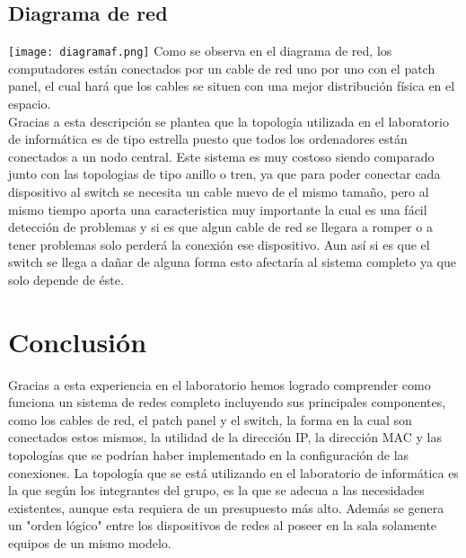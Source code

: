 \documentclass{udpreport}
\begin{document}
	\section{Diagrama de red}
		\texttt{[image: diagramaf.png]}
		Como se observa en el diagrama de red, los computadores están conectados por un cable de red uno por uno 
		con el patch panel, el cual hará que los cables se situen con una mejor distribución física 
		en el espacio.\\
		Gracias a esta descripción se plantea que la topología utilizada en el laboratorio de informática es de tipo estrella 
 		puesto que todos los ordenadores están conectados a un nodo central. Este sistema es muy costoso siendo comparado 
 		junto con las topologias de tipo anillo o tren, ya que para poder conectar cada dispositivo al switch se necesita un
 		cable nuevo de el mismo tamaño, pero al mismo tiempo aporta una caracteristica muy importante la cual es una fácil 
 		detección de problemas y si es que algun cable de red se llegara a romper o a tener problemas solo perderá la conexión
 		ese dispositivo. Aun así si es que el switch se llega a dañar de alguna forma esto afectaría al sistema completo ya
 		que solo depende de éste.
\chapter{Conclusión}
                Gracias a esta experiencia en el laboratorio hemos logrado comprender como funciona un sistema de redes completo 
                incluyendo sus principales componentes, como los cables de red, el patch panel y el switch, la forma en la cual son 
                conectados estos mismos, la utilidad de la dirección IP, la dirección MAC y las topologías que se podrían haber 
                implementado en la configuración de las conexiones. La topología que se está utilizando en el laboratorio de 
                informática es la que según los integrantes del grupo, es la que se adecua a las necesidades existentes, aunque esta 
                requiera de un presupuesto más alto. Además se genera un "orden lógico" entre los dispositivos de redes al poseer en 
                la sala solamente equipos de un mismo modelo.
\end{document}
